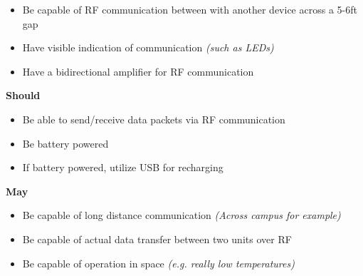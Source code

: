 \documentclass[12pt]{article}
\begin{document}
\begin{description}
\begin{itemize}
			\item{Be capable of RF communication between with another device across a 5-6ft gap}
			\item{Have visible indication of communication \textit{(such as LEDs)}}
			\item{Have a bidirectional amplifier for RF communication}
		\end{itemize}
		\textbf{Should}
		\begin{itemize}
			\item{Be able to send/receive data packets via RF communication}
			\item{Be battery powered}
			\item{If battery powered, utilize USB for recharging}
		\end{itemize}
		\textbf{May}
		\begin{itemize}
			\item{Be capable of long distance communication \textit{(Across campus for example)}}
			\item{Be capable of actual data transfer between two units over RF}
			\item{Be capable of operation in space \textit{(e.g. really low temperatures)}}
		\end{itemize}
\end{description}
\end{document}
